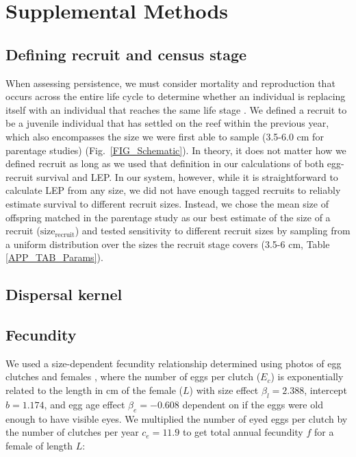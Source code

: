 \documentclass[12pt, oneside]{article}   	%
\begin{document}
\section{Supplemental Methods} \label{APP_SUPP_METHODS}

\subsection{Defining recruit and census stage} \label{APP_SEC_METHODS_Recruit_def}

When assessing persistence, we must consider mortality and reproduction that occurs across the entire life cycle to determine whether an individual is replacing itself with an individual that reaches the same life stage \citep{burgess2014beyond}. We defined a recruit to be a juvenile individual that has settled on the reef within the previous year, which also encompasses the size we were first able to sample (3.5-6.0 cm for parentage studies) (Fig.\ \ref{FIG_Schematic}). In theory, it does not matter how we defined recruit as long as we used that definition in our calculations of both egg-recruit survival and LEP. In our system, however, while it is straightforward to calculate LEP from any size, we did not have enough tagged recruits to reliably estimate survival to different recruit sizes. Instead, we chose the mean size of offspring matched in the parentage study as our best estimate of the size of a recruit ($\text{size}_\text{recruit}$) and tested sensitivity to different recruit sizes by sampling from a uniform distribution over the sizes the recruit stage covers (3.5-6 cm, Table \ref{APP_TAB_Params}).

\subsection*{Dispersal kernel} \label{APP_SEC_METHODS_Dispersal}

\subsection{Fecundity} \label{APP_SEC_METHODS_Fecundity}

We used a size-dependent fecundity relationship determined using photos of egg clutches and females \citep{yawdoszynInPrepfecundity}, where the number of eggs per clutch ($E_c$) is exponentially related to the length in cm of the female ($L$) with size effect $\beta_l = 2.388$, intercept $b = 1.174$, and egg age effect $\beta_e = -0.608$ dependent on if the eggs were old enough to have visible eyes. We multiplied the number of eyed eggs per clutch by the number of clutches per year $c_e = 11.9$ \citep[estimate from][]{holtswarth2017fecundity} to get total annual fecundity $f$ for a female of length $L$:
\end{document}
